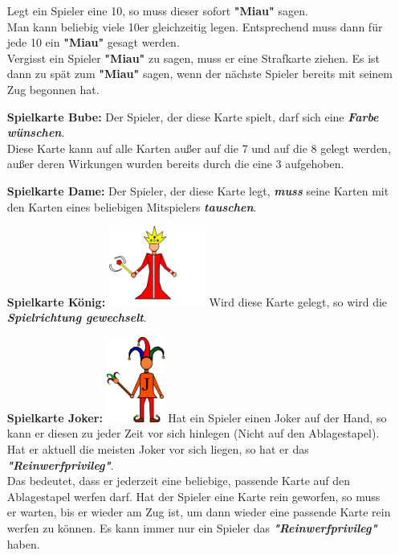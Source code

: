 \documentclass{article}
\begin{document}
\begin{itemize}
Legt ein Spieler eine 10, so muss dieser sofort \textbf{"Miau"} sagen. \\
Man kann beliebig viele 10er gleichzeitig legen. Entsprechend muss dann für jede 10 ein \textbf{"Miau"} gesagt werden. \\ Vergisst ein Spieler \textbf{"Miau"} zu sagen, muss er eine Strafkarte ziehen. Es ist dann zu spät zum \textbf{"Miau"} sagen, wenn der nächste Spieler bereits mit seinem Zug begonnen hat.
\item[\textbf{Spielkarte Bube:}]
Der Spieler, der diese Karte spielt, darf sich eine \textit{\textbf{Farbe wünschen}}. \\ Diese Karte kann auf alle Karten außer auf die 7 und auf die 8 gelegt werden, außer deren Wirkungen wurden bereits durch die eine 3 aufgehoben.
\item[\textbf{Spielkarte Dame:}]
Der Spieler, der diese Karte legt, \textit{\textbf{muss}} seine Karten mit den Karten eines beliebigen Mitspielers \textit{\textbf{tauschen}}.
\item[\textbf{Spielkarte König:}]
\includegraphics[width=0.25\textwidth]{photos/king.png}
Wird diese Karte gelegt, so wird die \textit{\textbf{Spielrichtung gewechselt}}.
\item[\textbf{Spielkarte Joker:}]
\includegraphics[width=0.15\textwidth]{photos/joker.png}
Hat ein Spieler einen Joker auf der Hand, so kann er diesen zu jeder Zeit vor sich hinlegen (Nicht auf den Ablagestapel). Hat er aktuell die meisten Joker vor sich liegen, so hat er das \textit{\textbf{"Reinwerfprivileg"}}. \\
Das bedeutet, dass er jederzeit eine beliebige, passende Karte auf den Ablagestapel werfen darf. Hat der Spieler eine Karte rein geworfen, so muss er warten, bis er wieder am Zug ist, um dann wieder eine passende Karte rein werfen zu können. Es kann immer nur ein Spieler das \textit{\textbf{"Reinwerfprivileg"}} haben. \\

\end{itemize}
\end{document}
